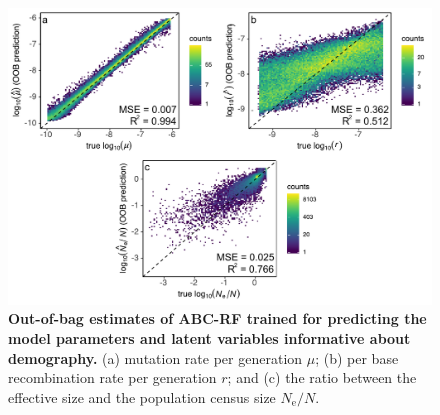\documentclass[a4paper, 12pt]{article}
\begin{document}
\begin{figure}[ht]
  \centering
  \includegraphics[width=1\textwidth]{Figures/FigureS3_oob_plots_demography.pdf}
  \small\caption{\textbf{Out-of-bag estimates of ABC-RF trained for predicting the model parameters and latent variables informative about demography.} (a) mutation rate per generation $\mu$; (b) per base recombination rate per generation $r$; and (c) the ratio between the effective size and the population census size $N_{\mathrm{e}}/N$.}\label{fig:supple_oob_demo}
\end{figure}
\end{document}
